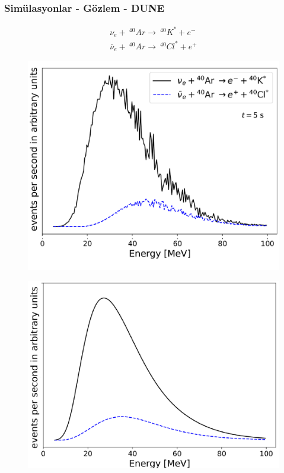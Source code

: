 \documentclass[10pt]{beamer}
\begin{document}
\begin{frame}
    \frametitle{Simülasyonlar - Gözlem - DUNE}
    \hrulefill
    \tiny

    \begin{align*}
        \nu_{e} +~ ^{40}\!Ar \rightarrow~ ^{40}\!K^{*} + e^{-}\\
        \bar{\nu}_{e} +~ ^{40}\!Ar \rightarrow~ ^{40}\!Cl^{*} + e^{+}
    \end{align*}
    \normalsize
    \hrulefill
    
    \begin{minipage}{0.45\textwidth}
        \begin{figure}[hbt!]
            \centering
            \includegraphics[width=\textwidth]{fig/10_1.pdf}
        \end{figure}
    \end{minipage}
    \hfill
    \begin{minipage}{0.45\textwidth}
        \begin{figure}[hbt!]
            \centering
            \includegraphics[width=\textwidth]{fig/10_2.pdf}
        \end{figure}
    \end{minipage}
\end{frame}
\end{document}
